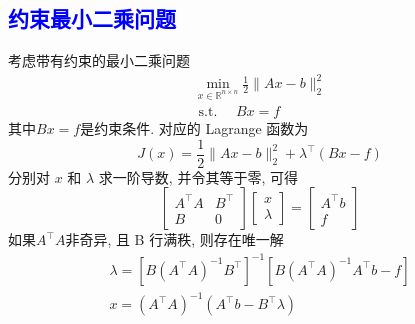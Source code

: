 \documentclass[12pt,a4paper]{article}
\begin{document}
\subsection{\textcolor{blue}{约束最小二乘问题}}
考虑带有约束的最小二乘问题
\begin{equation}
\begin{array}{l}{\min _{x \in \mathbb{R}^{n \times n}} \frac{1}{2}\|A x-b\|_{2}^{2}} \\ {\text { s.t. } \quad B x=f}\end{array}
\end{equation}
其中$B x=f$是约束条件. 对应的 Lagrange 函数为
$$
J(x)=\frac{1}{2}\|A x-b\|_{2}^{2}+\lambda^{\top}(B x-f)
$$
分别对 $x$ 和 $\lambda$ 求一阶导数, 并令其等于零, 可得
$$
\left[\begin{array}{cc}{A^{\top} A} & {B^{\top}} \\ {B} & {0}\end{array}\right]\left[\begin{array}{l}{x} \\ {\lambda}\end{array}\right]=\left[\begin{array}{c}{A^{\top} b} \\ {f}\end{array}\right]
$$
如果$A^{\top} A$非奇异, 且 B 行满秩, 则存在唯一解
$$
\begin{array}{l}{\lambda=\left[B\left(A^{\top} A\right)^{-1} B^{\top}\right]^{-1}\left[B\left(A^{\top} A\right)^{-1} A^{\top} b-f\right]} \\ {x=\left(A^{\top} A\right)^{-1}\left(A^{\top} b-B^{\top} \lambda\right)}\end{array}
$$
\end{document}
